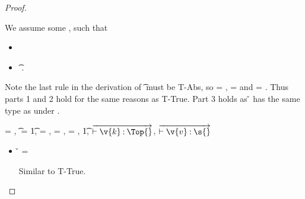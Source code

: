 \begin{lemma}
\begin{proof}
\begin{case}[T-Clos]
\begin{itemize}
\begin{subcase}[B-Abs]
        We assume some \propenvp{}, such that
        \begin{itemize}
          \item \satisfies{\openv{}}{\propenvp{}}
          \item \judgement {\propenvp{}} { {\t{}}}
                           {\filterset {\thenprop {\prop{}}}
                                       {\elseprop {\prop{}}}}
                           {\object{}}.
       \end{itemize}
       Note the last rule in the derivation of
          \judgement {\propenvp{}} { {\t{}}}
                           {\filterset {\thenprop {\prop{}}}
                                       {\elseprop {\prop{}}}}
                           {\object{}}
                           must be T-Abs, so 
                           {\thenprop {\prop{}}} = {\topprop{}},
                           {\elseprop {\prop{}}} = {\botprop{}}
                           and {\object{}} = {\emptyobject{}}.
         Thus parts 1 and 2 hold for the same reasons as T-True.
         Part 3 holds as \v{} has the same type as {\abs {\x{}} {\s{}} {}}
         under \propenvp{}.

      \end{subcase} 
  \end{itemize}
\end{case}

\begin{case}[T-Multi] \e{} = { {}},
  \t{} = {\MultiFntype {\s{}} {\t{1}}},
  {\thenprop {\prop{}}} = {\topprop{}},
  {\elseprop{\prop{}}} = {\botprop{}},
  {\object{}} = {\emptyobject{}},
  \judgementtwo {} { {\t{1}}},
  $\overrightarrow{\judgementtwo{}{\hastype{\v{k}}{\Top{}}}}$,
  $\overrightarrow{\judgementtwo{}{\hastype{\v{v}}{\s{}}}}$

  \begin{itemize}
    \item[]
      \begin{subcase}[B-Val] \v{} = { {}}

        Similar to T-True.
      \end{subcase}
  \end{itemize}

\end{case}


\end{proof}
\end{lemma}
